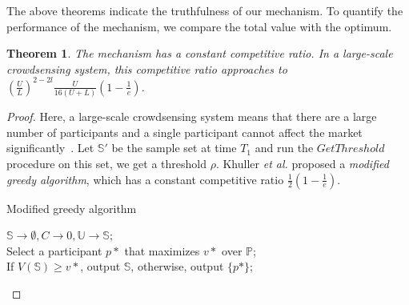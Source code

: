 \documentclass[10pt,journal,letterpaper,compsoc]{IEEEtran}
\newtheorem{theorem}{Theorem}
\newcommand{\et}{{\em et al. }}
\begin{document}
The above theorems indicate the truthfulness of our mechanism. To quantify the performance of the mechanism, we compare the total value with the optimum.

\begin{theorem}
The mechanism has a constant competitive ratio. In a large-scale crowdsensing system, this competitive ratio approaches to $\left(\frac{U}{L}\right)^{2-2l}\frac{U}{16(U+L)}(1-\frac{1}{e})$.
\end{theorem}
\begin{proof}
Here, a large-scale crowdsensing system means that there are a large number of participants and a single participant cannot affect the market significantly~\cite{6979011}. Let $\mathbb{S}'$ be the sample set at time $T_1$ and run the $GetThreshold$ procedure on this set, we get a threshold $\rho$. Khuller \et\cite{khuller1999budgeted} proposed a \emph{modified greedy algorithm}, which has a constant competitive ratio $\frac{1}{2}(1-\frac{1}{e})$. 

\begin{algorithm}
\BlankLine
{}
\caption{Modified greedy algorithm}
\label{alg:greedy}
\begin{small}
\BlankLine
$\mathbb{S}\rightarrow\emptyset,C\rightarrow 0,\mathbb{U}\rightarrow\mathbb{S}$;\\
Select a participant $p*$ that maximizes $v*$ over $\mathbb{P}$;\\
If $V(\mathbb{S})\ge v*$, output $\mathbb{S}$, otherwise, output $\{p*\}$;
\end{small}
\end{algorithm}





\end{proof}
\end{document}
